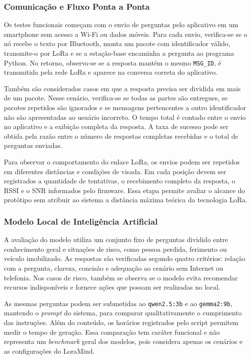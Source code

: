 \documentclass[12pt]{article}
\begin{document}
\subsubsection{Comunicação e Fluxo Ponta a Ponta}

Os testes funcionais começam com o envio de perguntas pelo aplicativo em um smartphone sem acesso a Wi-Fi ou dados móveis. Para cada envio, verifica-se se o nó recebe o texto por Bluetooth, monta um pacote com identificador válido, transmite-o por LoRa e se a estação-base encaminha a pergunta ao programa Python. No retorno, observa-se se a resposta mantém o mesmo \texttt{MSG\_ID}, é transmitida pela rede LoRa e aparece na conversa correta do aplicativo.

Também são considerados casos em que a resposta precisa ser dividida em mais de um pacote. Nesse cenário, verifica-se se todas as partes são entregues, se pacotes repetidos são ignorados e se mensagens pertencentes a outro identificador não são apresentadas ao usuário incorreto. O tempo total é contado entre o envio no aplicativo e a exibição completa da resposta. A taxa de sucesso pode ser obtida pela razão entre o número de respostas completas recebidas e o total de perguntas enviadas.

Para observar o comportamento do enlace LoRa, os envios podem ser repetidos em diferentes distâncias e condições de visada. Em cada posição devem ser registrados a quantidade de tentativas, o recebimento completo da resposta, o RSSI e o SNR informados pelo firmware. Essa etapa permite avaliar o alcance do protótipo sem atribuir ao sistema a distância máxima teórica da tecnologia LoRa.

\subsubsection{Modelo Local de Inteligência Artificial}

A avaliação do modelo utiliza um conjunto fixo de perguntas dividido entre conhecimento geral e situações de risco, como pessoa perdida, ferimento ou veículo imobilizado. As respostas são verificadas segundo quatro critérios: relação com a pergunta, clareza, concisão e adequação ao cenário sem Internet ou telefonia. Nos casos de risco, também se observa se o modelo evita recomendar recursos indisponíveis e fornece ações que possam ser realizadas no local.

As mesmas perguntas podem ser submetidas ao \texttt{qwen2.5:3b} e ao \texttt{gemma2:9b}, mantendo o \textit{prompt} do sistema, para comparar qualitativamente o cumprimento das instruções. Além do conteúdo, os horários registrados pelo script permitem medir o tempo de geração. Essa comparação tem caráter funcional e não representa um \textit{benchmark} geral dos modelos, pois considera apenas os cenários e as configurações do LoraMind.
\end{document}
